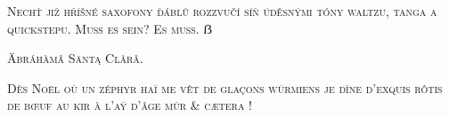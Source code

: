 \documentclass{scrartcl}
\begin{document}
\textsc{Nechť již hříšné saxofony ďáblů rozzvučí síň úděsnými tóny waltzu, tanga a quickstepu. Muß es sein? Es muss. ẞ}

\textsc{Äbráhàmâ Säntą Clårǎ.}

\textsc{Dès Noël où un zéphyr haï me vêt de glaçons würmiens je dîne d’exquis rôtis de bœuf au kir à l’aÿ d’âge mûr \& cætera !}
\end{document}
